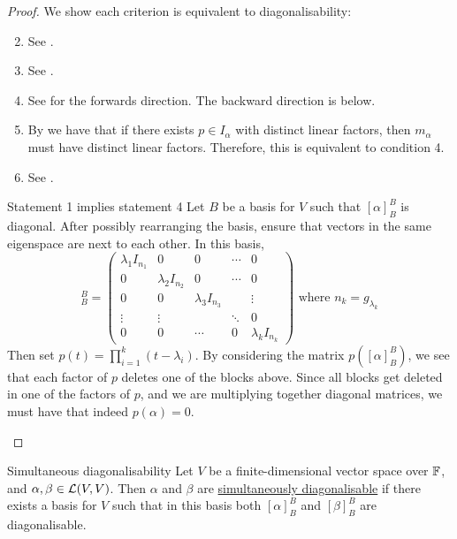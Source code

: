 \documentclass[../Main.tex]{subfiles}
\begin{document}
\begin{proof}
    We show each criterion is equivalent to diagonalisability:
    \begin{enumerate}
        \setcounter{enumi}{1}
        \item See .
        \item See .
        \item See  for the forwards direction. The backward direction is below.
        \item By  we have that if there exists $p \in I_\alpha$ with distinct linear factors, then $m_\alpha$ must have distinct linear factors. Therefore, this is equivalent to condition 4.
        \item See .
    \end{enumerate}
    \begin{subproof}{Statement 1 implies statement 4}
        Let $B$ be a basis for $V$ such that $[\alpha]_B^B$ is diagonal. After possibly rearranging the basis, ensure that vectors in the same eigenspace are next to each other. In this basis,
        \begin{equation*}
            [\alpha]_B^B =
            \begin{pmatrix}
                \lambda_1 I_{n_1} & 0 & 0 & \cdots & 0 \\
                0 & \lambda_2 I_{n_2} & 0 & \cdots & 0 \\
                0 & 0 & \lambda_3 I_{n_3} & & \vdots \\
                \vdots & \vdots & & \ddots & 0 \\
                0 & 0 & \cdots & 0 & \lambda_k I_{n_k}
            \end{pmatrix}
            \text{ where } n_k = g_{\lambda_k}
        \end{equation*}
        Then set $p(t) = \prod_{i=1}^{k} (t - \lambda_i)$. By considering the matrix $p([\alpha]_B^B)$, we see that each factor of $p$ deletes one of the blocks above. Since all blocks get deleted in one of the factors of $p$, and we are multiplying together diagonal matrices, we must have that indeed $p(\alpha) = 0$.
    \end{subproof}
\end{proof}
\begin{definition}{Simultaneous diagonalisability}
    Let $V$ be a finite-dimensional vector space over $\mathbb{F}$, and $\alpha, \beta \in \mathcal{L}(V, V)$. Then $\alpha$ and $\beta$ are \underline{simultaneously diagonalisable} if there exists a basis for $V$ such that in this basis both $[\alpha]_B^B$ and $[\beta]_B^B$ are diagonalisable.
\end{definition}
\end{document}
